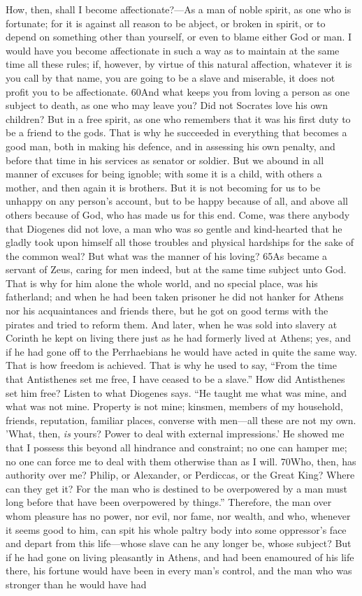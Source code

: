 How, then, shall I become affectionate?—As a man of noble spirit, as one who is fortunate; for it is against all reason to be abject, or broken in spirit, or to depend on something other than yourself, or even to blame either God or man. I would have you become affectionate in such a way as to maintain at the same time all these rules; if, however, by virtue of this natural affection, whatever it is you call by that name, you are going to be a slave and miserable, it does not profit you to be affectionate. 60And what keeps you from loving a person as one subject to death, as one who may leave you? Did not Socrates love his own children? But in a free spirit, as one who remembers that it was his first duty to be a friend to the gods. That is why he succeeded in everything that becomes a good man, both in making his defence, and in assessing his own penalty, and before that time in his services as senator or soldier. But we abound in all manner of excuses for being ignoble; with some it is a child, with others a mother, and then again it is brothers. But it is not becoming for us to be unhappy on any person's account, but to be happy because of all, and above all others because of God, who has made us for this end. Come, was there anybody that Diogenes did not love, a man who was so gentle and kind-hearted that he gladly took upon himself all those troubles and physical hardships for the sake of the common weal? But what was the manner of his loving? 65As became a servant of Zeus, caring for men indeed, but at the same time subject unto God. That is why for him alone the whole world, and no special place, was his fatherland; and when he had been taken prisoner he did not hanker for Athens nor his acquaintances and friends there, but he got on good terms with the pirates and tried to reform them. And later, when he was sold into slavery at Corinth he kept on living there just as he had formerly lived at Athens; yes, and if he had gone off to the Perrhaebians he would have acted in quite the same way. That is how freedom is achieved. That is why he used to say, ``From the time that Antisthenes set me free, I have ceased to be a slave.'' How did Antisthenes set him free? Listen to what Diogenes says. ``He taught me what was mine, and what was not mine. Property is not mine; kinsmen, members of my household, friends, reputation, familiar places, converse with men—all these are not my own. 'What, then, \emph{is} yours? Power to deal with external impressions.' He showed me that I possess this beyond all hindrance and constraint; no one can hamper me; no one can force me to deal with them otherwise than as I will. 70Who, then, has authority over me? Philip, or Alexander, or Perdiccas, or the Great King? Where can they get it? For the man who is destined to be overpowered by a man must long before that have been overpowered by things.'' Therefore, the man over whom pleasure has no power, nor evil, nor fame, nor wealth, and who, whenever it seems good to him, can spit his whole paltry body into some oppressor's face and depart from this life—whose slave can he any longer be, whose subject? But if he had gone on living pleasantly in Athens, and had been enamoured of his life there, his fortune would have been in every man's control, and the man who was stronger than he would have had 